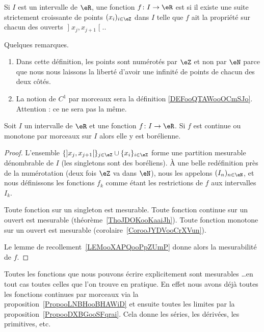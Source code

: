 \begin{definition}
	Si \( I\) est un intervalle de \( \eR\), une fonction \( f\colon I\to \eR\) est  si il existe une suite strictement croissante de points \( (x_i)_{i\in \eZ}\) dans \( I\) telle que \( f\) ait la propriété sur chacun des ouverts \( \mathopen] x_j ,x_{j+1} \mathclose[.\).
\end{definition}

\begin{remark}
	Quelques remarques.
	\begin{enumerate}
		\item
		      Dans cette définition, les points sont numérotés par \( \eZ\) et non par \( \eN\) parce que nous nous laissons la liberté d'avoir une infinité de points de chacun des deux côtés.

		\item
		      La notion de \( C^1\) par morceaux sera la définition \ref{DEFooQTAWooOCmSJo}. Attention : ce ne sera pas la même.
	\end{enumerate}
\end{remark}

\begin{proposition}     \label{PropooLNBHooBHAWiD}
	Soit \( I\) un intervalle de \( \eR\) et une fonction \( f\colon I\to \eR\). Si \( f\) est continue ou monotone par morceaux sur \( I\) alors elle y est borélienne.
\end{proposition}

\begin{proof}
	L'ensemble \( \{  \mathopen] x_j , x_{j+1} \mathclose[  \}_{j\in \eZ}\cup\{ x_i \}_{i\in \eZ}\) forme une partition mesurable dénombrable de \( I\) (les singletons sont des boréliens). À une belle redéfinition près de la numérotation (deux fois \( \eZ\) va dans \( \eN\)), nous les appelons \( (I_n)_{n\in \eN}\), et nous définissons les fonctions \( f_k\) comme étant les restrictions de \( f\) aux intervalles \( I_k\).

	Toute fonction sur un singleton est mesurable. Toute fonction continue sur un ouvert est mesurable (théorème~\ref{ThoJDOKooKaaiJh}). Toute fonction monotone sur un ouvert est mesurable (corolaire~\ref{CorooJYDVooCrXVun}).

	Le lemme de recollement~\ref{LEMooXAPQooPpZUmP} donne alors la mesurabilité de \( f\).
\end{proof}

\begin{normaltext}
	Toutes les fonctions que nous pouvons écrire explicitement sont mesurables \ldots en tout cas toutes celles que l'on trouve en pratique. En effet nous avons déjà toutes les fonctions continues par morceaux via la proposition~\ref{PropooLNBHooBHAWiD} et ensuite toutes les limites par la proposition~\ref{PropooDXBGooSFqrai}. Cela donne les séries, les dérivées, les primitives, etc.
\end{normaltext}
